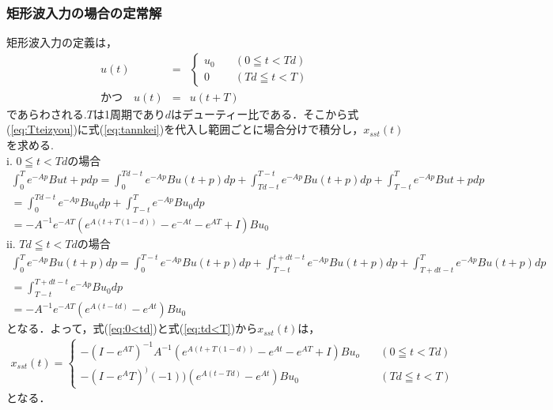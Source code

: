 \documentclass[12pt]{jarticle}
\begin{document}
\subsubsection{矩形波入力の場合の定常解}
矩形波入力の定義は，
\begin{eqnarray}
u(t ) &=& 
\begin{cases}
u_0 \quad &(0\leqq t <Td)  \\
0 \quad &(Td\leqq t <T) 
\end{cases}
\nonumber
\\
\label{eq:tannkei}
かつ\quad u(t)&=&u(t+T)
\end{eqnarray}
であらわされる.$T$は1周期であり$d$はデューティー比である．そこから式(\ref{eq:Tteizyou})に式(\ref{eq:tannkei})を代入し範囲ごとに場合分けで積分し，$x_{sst}(t)$を求める.
\\ \qquad i. $0\leqq t<Tdの場合$
\begin{gather}
\int_{0}^{T}e^{-Ap}Bu{t+p}dp=\int_{0}^{Td-t}e^{-Ap}Bu(t+p)dp+\int_{Td-t}^{T-t}e^{-Ap}Bu(t+p)dp+\int_{T-t}^{T}e^{-Ap}Bu{t+p}dp\nonumber \\
=\int_{0}^{Td-t}e^{-Ap}Bu_0dp+\int_{T-t}^{T}e^{-Ap}Bu_0dp \nonumber \\ 
=-A^{-1}e^{-AT}(e^{A(t+T(1-d))}-e^{-At}-e^{AT}+I)Bu_0
\label{eq:0<td}
\end{gather}
\qquad ii. $Td \leqq t <Tdの場合$
\begin{gather}
\int_{0}^{T}e^{-Ap}Bu(t+p)dp=\int_{0}^{T-t}e^{-Ap}Bu(t+p)dp+\int_{T-t}^{t+dt-t}e^{-Ap}Bu(t+p)dp+\int_{T+dt-t}^{T}e^{-Ap}
Bu(t+p)dp \nonumber\\
=\int_{T-t}^{T+dt-t}e^{-Ap}Bu_0dp \nonumber\\
=-A^{-1}e^{-AT}(e^{A(t-td)}-e^{At})Bu_0
\label{eq:td<T}
\end{gather}
となる．よって，式(\ref{eq:0<td})と式(\ref{eq:td<T})から$x_{sst}(t)$は，
\begin{eqnarray}
x_{sst}(t)=
\begin{cases}
	-(I-e^{AT})^{-1}A^{-1}(e^{A(t+T(1-d))}-e^{At}-e^{AT}+I)Bu_o &\quad (0\leqq t <Td)\\
	-(I-e^AT)^)(-1))(e^{A(t-Td)}-e^{At})Bu_0 & \quad(Td\leqq t <T)
	\label{eq:tannkei}
\end{cases} 
\end{eqnarray}
となる．
\end{document}
